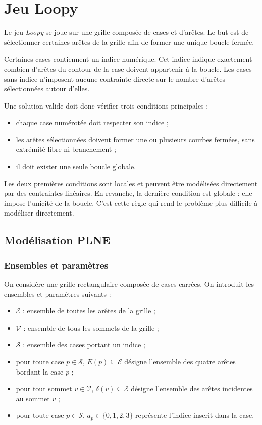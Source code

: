 \section{Jeu Loopy}

Le jeu \textit{Loopy} se joue sur une grille composée de cases et d'arêtes. Le but est de sélectionner certaines arêtes de la grille afin de former une unique boucle fermée.

Certaines cases contiennent un indice numérique. Cet indice indique exactement combien d'arêtes du contour de la case doivent appartenir à la boucle. Les cases sans indice n'imposent aucune contrainte directe sur le nombre d'arêtes sélectionnées autour d'elles.

Une solution valide doit donc vérifier trois conditions principales :
\begin{itemize}
    \item chaque case numérotée doit respecter son indice ;
    \item les arêtes sélectionnées doivent former une ou plusieurs courbes fermées, sans extrémité libre ni branchement ;
    \item il doit exister une seule boucle globale.
\end{itemize}

Les deux premières conditions sont locales et peuvent être modélisées directement par des contraintes linéaires. En revanche, la dernière condition est globale : elle impose l'unicité de la boucle. C'est cette règle qui rend le problème plus difficile à modéliser directement.

\subsection{Modélisation PLNE}

\subsubsection{Ensembles et paramètres}

On considère une grille rectangulaire composée de cases carrées. On introduit les ensembles et paramètres suivants :
\begin{itemize}
    \item \(\mathcal{E}\) : ensemble de toutes les arêtes de la grille ;
    \item \(\mathcal{V}\) : ensemble de tous les sommets de la grille ;
    \item \(\mathcal{S}\) : ensemble des cases portant un indice ;
    \item pour toute case \(p \in \mathcal{S}\), \(E(p) \subseteq \mathcal{E}\) désigne l'ensemble des quatre arêtes bordant la case \(p\) ;
    \item pour tout sommet \(v \in \mathcal{V}\), \(\delta(v) \subseteq \mathcal{E}\) désigne l'ensemble des arêtes incidentes au sommet \(v\) ;
    \item pour toute case \(p \in \mathcal{S}\), \(a_p \in \{0,1,2,3\}\) représente l'indice inscrit dans la case.
\end{itemize}

